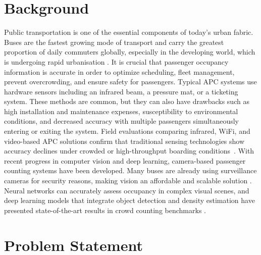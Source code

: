 
\section{Background}

Public transportation is one of the essential components of today's urban fabric. Buses are the fastest growing mode of transport and carry the greatest proportion of daily commuters globally, especially in the developing world, which is undergoing rapid urbanisation \cite{itf_outlook_2023}. It is crucial that passenger occupancy information is accurate in order to optimize scheduling, fleet management, prevent overcrowding, and ensure safety for passengers. Typical APC systems use hardware sensors including an infrared beam, a pressure mat, or a ticketing system. These methods are common, but they can also have drawbacks such as high installation and maintenance expenses, susceptibility to environmental conditions, and decreased accuracy with multiple passengers simultaneously entering or exiting the system. Field evaluations comparing infrared, WiFi, and video-based APC solutions confirm that traditional sensing technologies show accuracy declines under crowded or high-throughput boarding conditions~\cite{grgurevic2021review}. With recent progress in computer vision and deep learning, camera-based passenger counting systems have been developed. Many buses are already using surveillance cameras for security reasons, making vision an affordable and scalable solution \cite{Chris2023}. Neural networks can accurately assess occupancy in complex visual scenes, and deep learning models that integrate object detection and density estimation have presented state-of-the-art results in crowd counting benchmarks \cite{gao2022caaisurvey}.

\section{Problem Statement}

